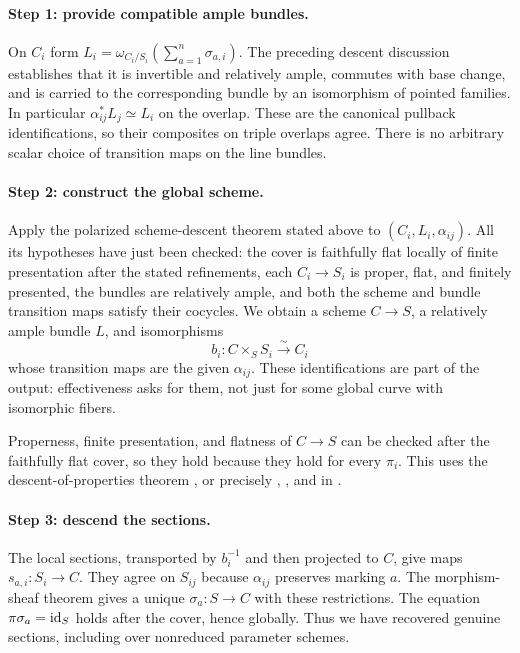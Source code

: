 \paragraph{Step 1: provide compatible ample bundles.}
On $C_i$ form
$L_i=\omega_{C_i/S_i}(\sum_{a=1}^n\sigma_{a,i})$.
The preceding descent discussion establishes that it is invertible
and relatively ample, commutes with base change, and is carried to
the corresponding bundle by an isomorphism of pointed families.
In particular $\alpha_{ij}^*L_j\simeq L_i$ on the overlap.
These are the canonical pullback identifications, so their
composites on triple overlaps agree. There is no arbitrary
scalar choice of transition maps on the line bundles.

\paragraph{Step 2: construct the global scheme.}
Apply the polarized scheme-descent theorem stated above to
$(C_i,L_i,\alpha_{ij})$. All its hypotheses have just been
checked: the cover is faithfully flat locally of finite
presentation after the stated refinements, each $C_i\to S_i$
is proper, flat, and finitely presented, the bundles are relatively
ample, and both the scheme and bundle transition maps satisfy
their cocycles. We obtain a scheme $C\to S$, a relatively ample
bundle $L$, and isomorphisms
\[
                       b_i:C\times_SS_i\xrightarrow{\sim}C_i
\]
whose transition maps are the given $\alpha_{ij}$. These
identifications are part of the output: effectiveness asks for
them, not just for some global curve with isomorphic fibers.

Properness, finite presentation, and flatness of $C\to S$ can
be checked after the faithfully flat cover, so they hold because
they hold for every $\pi_i$. This uses the descent-of-properties
theorem \cite[Proposition 1.15, pp.~11--12]{Vistoli}, or precisely
, , and  in \cite{Stacks}.

\paragraph{Step 3: descend the sections.}
The local sections, transported by $b_i^{-1}$ and then projected
to $C$, give maps $s_{a,i}:S_i\to C$. They agree on $S_{ij}$
because $\alpha_{ij}$ preserves marking $a$. The morphism-sheaf
theorem gives a unique $\sigma_a:S\to C$ with these restrictions.
The equation $\pi\sigma_a=\operatorname{id}_S$ holds after the cover, hence
globally. Thus we have recovered genuine sections, including
over nonreduced parameter schemes.

